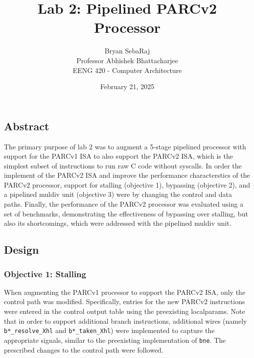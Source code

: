 \documentclass[12pt]{article}
\title{Lab 2: Pipelined PARCv2 Processor}
\author{Bryan SebaRaj \\[0.5em] Professor Abhishek Bhattacharjee \\[0.5em] EENG 420 - Computer Architecture}
\date{February 21, 2025}
\begin{document}
\maketitle


\subsection*{Abstract}

The primary purpose of lab 2 was to augment a 5-stage pipelined processor with
support for the PARCv1 ISA to also support the PARCv2 ISA, which is the
simplest subset of instructions to run raw C code without syscalls. In order
the implement of the PARCv2 ISA and improve the performance characterstics of
the PARCv2 processor, support for stalling (objective 1), bypassing (objective
2), and a pipelined muldiv unit (objective 3) were by changing the control and
data paths. Finally, the performance of the PARCv2 processor was evaluated
using a set of benchmarks, demonstrating the effectiveness of bypassing over
stalling, but also its shortcomings, which were addressed with the pipelined
muldiv unit.
\subsection*{Design}

\subsubsection*{Objective 1: Stalling}

When augmenting the PARCv1 processor to support the PARCv2 ISA, only the
control path was modified. Specifically, entries for the new PARCv2
instructions were entered in the control output table using the preexisting
localparams. Note that in order to support additional branch instructions,
additional wires (namely \texttt{b*\_resolve\_Xhl} and \texttt{b*\_taken\_Xhl}) were implemented to capture the appropriate signals, similar
to the preexisting implementation of \texttt{bne}. The prescribed changes to the control path were followed.
\end{document}
